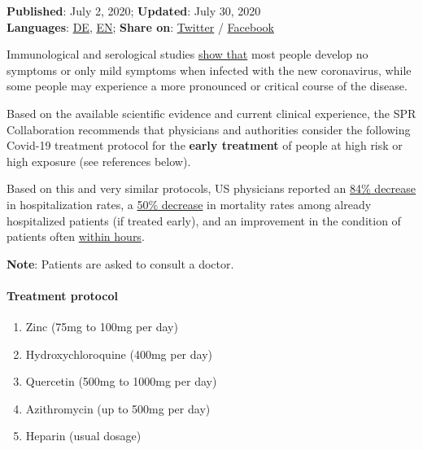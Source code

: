 \textbf{Published}: July 2, 2020; \textbf{Updated}: July 30, 2020\\
\textbf{Languages}:
\href{https://swprs.org/zur-behandlung-von-covid-19/}{DE},
\href{https://swprs.org/on-the-treatment-of-covid-19/}{EN};
\textbf{Share on}:
\href{https://twitter.com/intent/tweet?url=https://swprs.org/on-the-treatment-of-covid-19/}{Twitter}
/
\href{https://www.facebook.com/share.php?u=https://swprs.org/on-the-treatment-of-covid-19/}{Facebook}

Immunological and serological studies
\href{https://swprs.org/studies-on-covid-19-lethality/}{show that} most
people develop no symptoms or only mild symptoms when infected with the
new coronavirus, while some people may experience a more pronounced or
critical course of the disease.

Based on the available scientific evidence and current clinical
experience, the SPR Collaboration recommends that physicians and
authorities consider the following Covid-19 treatment protocol for the
\textbf{early treatment} of people at high risk or high exposure (see
references below).

Based on this and very similar protocols, US physicians reported an
\href{https://www.preprints.org/manuscript/202007.0025/v1}{84\%
decrease} in hospitalization rates, a
\href{https://www.henryford.com/news/2020/07/hydro-treatment-study}{50\%
decrease} in mortality rates among already hospitalized patients (if
treated early), and an improvement in the condition of patients often
\href{https://www.youtube.com/watch?v=eVs_EWVCVPc}{within hours}.

\textbf{Note}: Patients are asked to consult a doctor.

\hypertarget{treatment-protocol}{%
\paragraph{Treatment protocol}\label{treatment-protocol}}

\begin{enumerate}
\def\labelenumi{\arabic{enumi}.}
\tightlist
\item
  Zinc (75mg to 100mg per day)
\item
  Hydroxychloroquine (400mg per day)
\item
  Quercetin (500mg to 1000mg per day)
\item
  Azithromycin (up to 500mg per day)
\item
  Heparin (usual dosage)
\end{enumerate}

